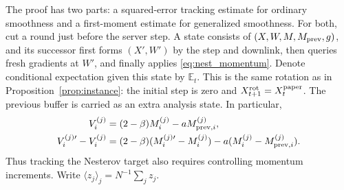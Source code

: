 \begin{codex}
The proof has two parts: a squared-error tracking estimate for ordinary
smoothness and a first-moment estimate for generalized smoothness.
For both, cut a round just before the server step. A state consists of
$(X,W,M,M_{\rm prev},g)$, and its successor first forms $(X',W')$ by the
step and downlink, then queries fresh gradients at $W'$, and finally applies
\eqref{eq:nest_momentum}. Denote conditional expectation given this state by
$\mathbb E_t$. This is the same rotation as in
Proposition~\ref{prop:instance}: the initial step is zero and
$X_{t+1}^{\rm rot}=X_t^{\rm paper}$. The previous buffer is carried as an
extra analysis state. In particular,
\begin{align}
 V_i^{(j)}&=(2-\beta)M_i^{(j)}-aM_{{\rm prev},i}^{(j)},\nonumber\\
 V_i^{(j)\prime}-V_i^{(j)}
 &=(2-\beta)(M_i^{(j)\prime}-M_i^{(j)})
       -a(M_i^{(j)}-M_{{\rm prev},i}^{(j)}).\label{eq:nest_increment}
\end{align}
Thus tracking the Nesterov target also requires controlling momentum
increments. Write $\langle z_j\rangle_j=N^{-1}\sum_jz_j$.


\end{codex}
